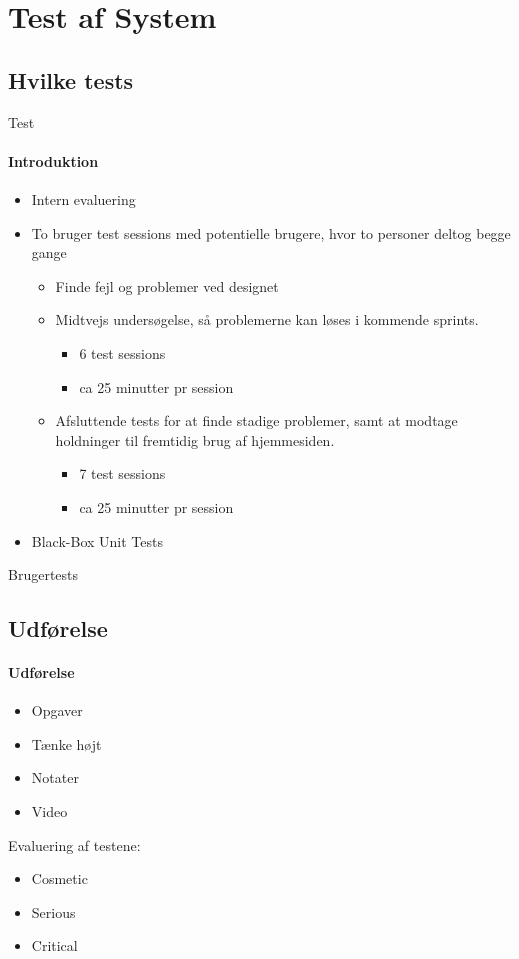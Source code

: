 \section{Test af System}

\subsection{Hvilke tests}
\begin{frame}{Test}
\framesubtitle{Introduktion}
	
	\begin{itemize}
	\item Intern evaluering
	\item	To bruger test sessions med potentielle brugere, hvor to personer deltog begge gange
		\begin{itemize}
			\item Finde fejl og problemer ved designet
			\item Midtvejs undersøgelse, så problemerne kan løses i kommende sprints.
				\begin{itemize}
					\item 6 test sessions
					\item ca 25 minutter pr session
				\end{itemize}
			\item Afsluttende tests for at finde stadige problemer, samt at modtage holdninger til fremtidig brug af hjemmesiden.
				\begin{itemize}
					\item 7 test sessions
					\item ca 25 minutter pr session
				\end{itemize}
		\end{itemize}
	\item 	Black-Box Unit Tests
	
	\end{itemize}
	
\end{frame}

\begin{frame}{Brugertests}
	\subsection{Udførelse}
	\framesubtitle{Udførelse}
	
	\begin{itemize}
		\item Opgaver 
		\item Tænke højt
		\item Notater
		\item Video	
	\end{itemize}
	
	Evaluering af testene:
	\begin{itemize}
		\item Cosmetic
		\item Serious
		\item Critical
	\end{itemize}
	
\end{frame}
	
